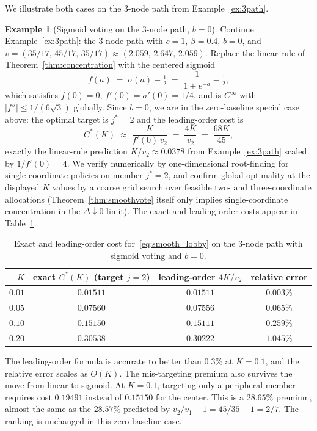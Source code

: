 \documentclass[11pt,letterpaper]{article}
\theoremstyle{plain}
\theoremstyle{definition}
\newtheorem{example}{Example}
\theoremstyle{remark}
\begin{document}
We illustrate both cases on the 3-node path from Example~\ref{ex:3path}.

\begin{example}[Sigmoid voting on the 3-node path, $b = 0$]\label{ex:smooth3path}
Continue Example~\ref{ex:3path}: the 3-node path with $c = 1$, $\beta = 0.4$, $b = 0$, and $v = (35/17,\, 45/17,\, 35/17) \approx (2.059,\, 2.647,\, 2.059)$. Replace the linear rule of Theorem~\ref{thm:concentration} with the centered sigmoid
\[
f(a) \;=\; \sigma(a) - \tfrac{1}{2} \;=\; \frac{1}{1 + e^{-a}} - \tfrac{1}{2},
\]
which satisfies $f(0) = 0$, $f'(0) = \sigma'(0) = 1/4$, and is $C^\infty$ with $|f''| \leq 1/(6\sqrt 3)$ globally. Since $b = 0$, we are in the zero-baseline special case above: the optimal target is $j^* = 2$ and the leading-order cost is
\[
C^*(K) \;\approx\; \frac{K}{f'(0)\, v_2} \;=\; \frac{4 K}{v_2} \;=\; \frac{68 K}{45},
\]
exactly the linear-rule prediction $K/v_2 \approx 0.0378$ from Example~\ref{ex:3path} scaled by $1/f'(0) = 4$. We verify numerically by one-dimensional root-finding for single-coordinate policies on member $j^* = 2$, and confirm global optimality at the displayed $K$ values by a coarse grid search over feasible two- and three-coordinate allocations (Theorem~\ref{thm:smoothvote} itself only implies single-coordinate concentration in the $\Delta \downarrow 0$ limit). The exact and leading-order costs appear in Table~\ref{tab:smoothex}.

\begin{table}[h]
\centering
\begin{tabular}{rccc}
\toprule
$K$ & exact $C^*(K)$ (target $j = 2$) & leading-order $4K/v_2$ & relative error \\
\midrule
$0.01$ & $0.01511$ & $0.01511$ & $0.003\%$ \\
$0.05$ & $0.07560$ & $0.07556$ & $0.065\%$ \\
$0.10$ & $0.15150$ & $0.15111$ & $0.259\%$ \\
$0.20$ & $0.30538$ & $0.30222$ & $1.045\%$ \\
\bottomrule
\end{tabular}
\caption{Exact and leading-order cost for~\eqref{eq:smooth_lobby} on the 3-node path with sigmoid voting and $b = 0$.}
\label{tab:smoothex}
\end{table}

The leading-order formula is accurate to better than $0.3\%$ at $K = 0.1$, and the relative error scales as $O(K)$. The mis-targeting premium also survives the move from linear to sigmoid. At $K = 0.1$, targeting only a peripheral member requires cost $0.19491$ instead of $0.15150$ for the center. This is a $28.65\%$ premium, almost the same as the $28.57\%$ predicted by $v_2/v_1 - 1 = 45/35 - 1 = 2/7$. The ranking is unchanged in this zero-baseline case.
\end{example}
\end{document}
